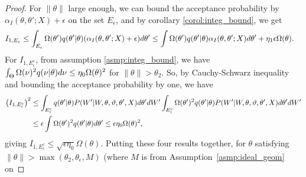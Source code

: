 \begin{proof}
%
For $\|\theta\|$ large enough, we can bound the acceptance probability 
by $\alpha_I(\theta,\theta'; X) + \epsilon$ on the set $E_\epsilon$, and by corollary 
\ref{corol:integ_bound}, we get 
\begin{align*}
  I_{1,E_\epsilon} & \leq \int_{E_\epsilon} \Omega(\theta')q(\theta' | \theta) (\alpha_I(\theta, \theta'; X) + \epsilon) d\theta' 
 \leq \int \Omega(\theta')q(\theta' | \theta) \alpha_I(\theta, \theta'; X) d\theta' + \eta_1 \epsilon \Omega(\theta).
\end{align*}
For $I_{1,E_\epsilon^c}$, 
from assumption \ref{asmp:integ_bound}, %
we have $\int_\Theta \Omega(\nu)^2 q(\nu | \theta)d\nu \leq \eta_0 \Omega(\theta)^2$
for $\|\theta\| > \theta_2$.
So, by Cauchy-Schwarz inequality and bounding the acceptance probability by one, we have
\begin{align*}
  \left( I_{1,E_\epsilon^c}\right)^2 %
& \le \int_{\E_\epsilon^c} q(\theta' | \theta) P(W' |W, \theta, \vartheta, \theta', X)d\theta'dW'  \int_{\E_\epsilon^c}  \Omega(\theta')^2 q(\theta' | \theta) P(W' |W, \theta, \vartheta, \theta', X)d\theta'dW'   \\
& \le \epsilon \int  \Omega(\theta')^2 q(\theta' | \theta)d\theta' 
 \le \epsilon \eta_0 \Omega(\theta)^2 ,
\end{align*}
giving
$
I_{1,E_\epsilon^c}  \le \sqrt{\epsilon \eta_0 }\Omega(\theta) .
$
Putting these four results together, for $\theta$ satisfying $ \| \theta \| >\max(\theta_2, 
\theta_\epsilon, M) $ 
(where $M$ is from Assumption~\ref{asmp:ideal_geom} on 

\end{proof}

